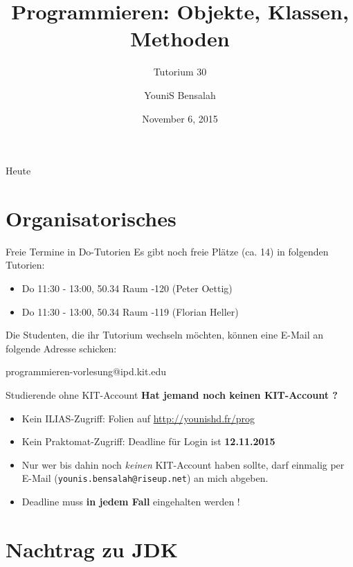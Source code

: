 \documentclass[18pt]{beamer}
\title[Objekte, Klassen, Methoden]{Programmieren: Objekte, Klassen, Methoden}
\subtitle{Tutorium 30}
\author{YouniS Bensalah}
\date{November 6, 2015}
\institute{Chair for Software Design and Quality}
\begin{document}

\begin{frame}
\titlepage
\end{frame}

\begin{frame}{Heute}
\tableofcontents
\end{frame}

\section{Organisatorisches}

\begin{frame}{Freie Termine in Do-Tutorien}
    Es gibt noch freie Plätze (ca. 14) in folgenden Tutorien:
    \begin{itemize}
        \item Do 11:30 - 13:00, 50.34 Raum -120 (Peter Oettig)
        \item Do 11:30 - 13:00, 50.34 Raum -119 (Florian Heller)
    \end{itemize}
    Die Studenten, die ihr Tutorium wechseln möchten, können eine E-Mail an folgende Adresse schicken:\\
    \begin{center}
    {\Large programmieren-vorlesung@ipd.kit.edu}
    \end{center}
\end{frame}

\begin{frame}{Studierende ohne KIT-Account}
    \textbf{Hat jemand noch keinen KIT-Account ?}
    \pause
    \begin{itemize}
        \item Kein ILIAS-Zugriff: Folien auf \url{http://younishd.fr/prog}
        \item \alert{Kein Praktomat-Zugriff: Deadline für Login ist \textbf{12.11.2015}}
        \item Nur wer bis dahin noch \textit{keinen} KIT-Account haben sollte, darf einmalig per E-Mail (\texttt{younis.bensalah@riseup.net}) an mich abgeben.
        \item Deadline muss \textbf{in jedem Fall} eingehalten werden !
    \end{itemize}
\end{frame}

\section{Nachtrag zu JDK}
\end{document}
